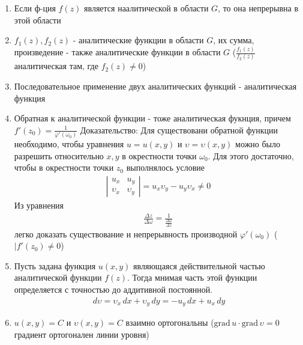 \documentclass[12pt]{extarticle}
\newcommand{\grad}{\mathrm{grad}\,}
\renewcommand{\v}{\upsilon}
\renewcommand{\d}{\,d}
\begin{document}
\begin{enumerate}
    \item Если ф-ция $f(z)$ является наалитической в области $G$, то она
        непрерывна в этой области
    \item $f_{1}(z),f_{2}(z)$ - аналитические функции в области $G$, их
        сумма, произведение - также аналитические функции в области $G$
        ($\frac{f_{1}(z)}{f_{2}(z)}$ аналитическая там, где
        $f_{2}(z)\neq 0$)
    \item Последовательное применение двух аналитических функций -
        аналитическая функция
    \item Обратная к аналитической функции - тоже аналитическая фукнция,
        причем $f'(z_{0})=\frac{1}{\varphi'(\omega_{0})}$
        \subitem Доказательство: Для существовани обратной функции
        необходимо, чтобы уравнения $u=u(x,y)$ и
        $\upsilon=\upsilon(x,y)$ можно было разрешить относительно $x,y$
        в окрестности точки $\omega_{0}$. Для этого достаточно, чтобы в
        окрестности точки $z_{0}$ выполнялось условие
        \begin{eqnarray*}
            \left|\begin{array}{cc}
                u_{x} & u_{y} \\ \upsilon_{x} & \upsilon_{y}
            \end{array} \right| =
            u_{x}\upsilon_{y}-u_{y}\upsilon_{x}\neq 0
        \end{eqnarray*}
        Из уравнения
        \begin{eqnarray*}
        \frac{\Delta z}{\Delta \omega}=\frac{1}{\frac{\Delta
        \omega}{\Delta z}}
        \end{eqnarray*}
        легко доказать существование и непрерывность производной
        $\varphi'(\omega_{0})$ ($|f'(z_{0})\neq 0$)
    \item Пусть задана функция $u(x,y)$ являющаяся действительной частью
        аналитической функции $f(z)$. Тогда мнимая часть этой функции
        определяется с точностью до аддитивной постоянной.
        \begin{eqnarray*}
            \d\v=\v_{x}\d{x}+\v_{y}\d{y}
            =-u_{y}\d{x}+u_{x}\d{y}
        \end{eqnarray*}
    \item $u(x,y)=C$ и $\v(x,y)=C$ взаимно ортогональны
        ($\grad{u}\cdot\grad{\v}=0$ градиент ортогонален линии уровня)
\end{enumerate}
\end{document}
